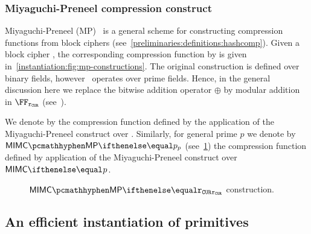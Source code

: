 \subsubsection{Miyaguchi-Preneel compression construct}

Miyaguchi-Preneel (MP)~\cite[$f_3$ function]{black2002black} is a general scheme for constructing compression functions from block ciphers (see~\cref{preliminaries:definitions:hashcomp}). Given a block cipher \Enc, the corresponding compression function by \fMP{} is given in~\cref{instantiation:fig:mp-constructions}. The original construction is defined over binary fields, however \zeth~operates over prime fields. Hence, in the general discussion here we replace the bitwise addition operator $\oplus$ by modular addition in $\FFx{\rCURVE}$ (see~\cite{mp-security-ethsnarks}).

We denote by \mimcMP{} the compression function defined by the application of the Miyaguchi-Preneel construct over \mimc{}. Similarly, for general prime $p$ we denote by $\mimcMPPrime{p}$ (see~\cref{instantiation:fig:mimc-mp-constructions}) the compression function defined by application of the Miyaguchi-Preneel construct over $\mimcPrime{p}$.

\begin{figure*}[ht]
    \begin{minipage}[t]{0.50\textwidth}
        \caption{\MP{} construct in $\FFx{\rCURVE}$.}\label{instantiation:fig:mp-constructions}
    \end{minipage}%
    \begin{minipage}[t]{0.50\textwidth}
    \caption{$\mimcMPPrime{\rCURVE}$ construction.}\label{instantiation:fig:mimc-mp-constructions}
    \end{minipage}%
\end{figure*}

\subsection{An efficient instantiation of \mimc{} primitives}\label{instantiation:mkhash:efficient-instance}

